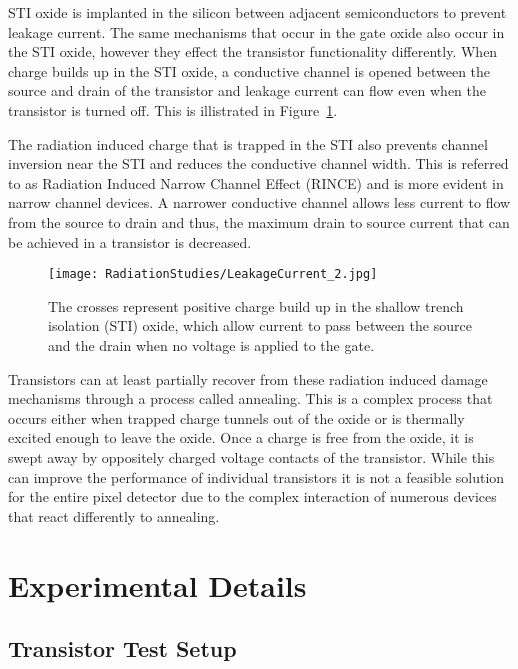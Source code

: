 STI oxide is implanted in the silicon between adjacent semiconductors to prevent leakage current. The same mechanisms that occur in the gate oxide also occur in the STI oxide, however they effect the transistor functionality differently. When charge builds up in the STI oxide, a conductive channel is opened between the source and drain of the transistor and leakage current can flow even when the transistor is turned off. This is illistrated in Figure~\ref{fig:LeakageCurrent}\cite{LeakageCurrent}. 

The radiation induced charge that is trapped in the STI also prevents channel inversion near the STI and reduces the conductive channel width. This is referred to as Radiation Induced Narrow Channel Effect (RINCE)\cite{RINCE} and is more evident in narrow channel devices. A narrower conductive channel allows less current to flow from the source to drain and thus, the maximum drain to source current that can be achieved in a transistor is decreased.

\begin{figure}[h!]
\begin{center}
\texttt{[image: RadiationStudies/LeakageCurrent\_2.jpg]}
\end{center}
\caption{The crosses represent positive charge build up in the shallow trench isolation (STI) oxide, which allow current to pass between the source and the drain when no voltage is applied to the gate\cite{LeakageCurrent}.}
\label{fig:LeakageCurrent}
\end{figure}

Transistors can at least partially recover from these radiation induced damage mechanisms through a process called annealing. This is a complex process that occurs either when trapped charge tunnels out of the oxide or is thermally excited enough to leave the oxide. Once a charge is free from the oxide, it is swept away by oppositely charged voltage contacts of the transistor. While this can improve the performance of individual transistors it is not a feasible solution for the entire pixel detector due to the complex interaction of numerous devices that react differently to annealing.

\section{Experimental Details}

\subsection{Transistor Test Setup}

